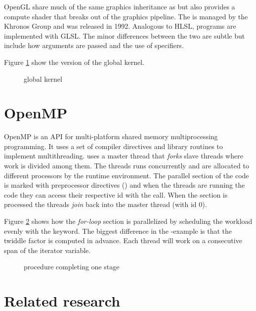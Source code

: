 \gls{OpenGL} share much of the same graphics inheritance as {\DX} but also provides a compute shader that breaks out of the graphics pipeline. The {\GL} is managed by the Khronos Group and was released in 1992. Analogous to \gls{HLSL}, {\GL} programs are implemented with \gls{GLSL}. The minor differences between the two are subtle but include how arguments are passed and the use of specifiers.

Figure \ref{lst:sample:global:gl} show the {\GL} version of the global kernel.

\begin{figure}
	\centering
	\fbox{}
	\caption{{\GL} global kernel}
	\label{lst:sample:global:gl}	
\end{figure}

\section{OpenMP}

\gls{OpenMP} is an \gls{API} for multi-platform shared memory multiprocessing programming. It uses a set of compiler directives and library routines to implement multithreading. {\OMP} uses a master thread that \emph{forks} slave threads where work is divided among them. The threads runs concurrently and are allocated to different processors by the runtime environment. The parallel section of the code is marked with preprocessor directives () and when the threads are running the code they can access their respective id with the  call. When the section is processed the threads \emph{join} back into the master thread (with id $0$).

Figure \ref{lst:sample:global:omp} shows how the \emph{for-loop} section is parallelized by scheduling the workload evenly with the  keyword. The biggest difference in the {\OMP}-example is that the twiddle factor is computed in advance. Each thread will work on a consecutive span of the iterator variable.

\begin{figure}
	\centering
	\fbox{}%
	\caption{{\OMP} procedure completing one stage}%
	\label{lst:sample:global:omp}%
\end{figure}%

\section{Related research}

